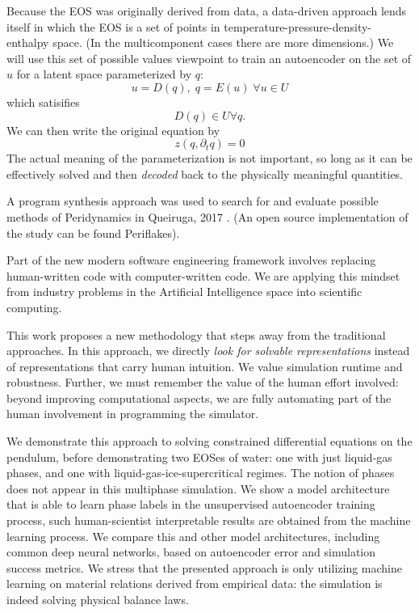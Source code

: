 \documentclass[]{article}
\begin{document}
Because the EOS was originally derived from data, a data-driven
approach lends itself in which the EOS is a set of points in
temperature-pressure-density-enthalpy space. (In the multicomponent
cases there are more dimensions.)
We will use this set of possible values viewpoint to train an
autoencoder on the set of $u$ for a latent space parameterized by $q$:
\begin{equation}
u = D(q), \; q=E(u) \;\forall u \in U
\end{equation}
which satisifies
\begin{equation}
  D(q)\in U \forall q.
\end{equation}
We can then write the original equation by
\begin{equation}
z(q,\partial_t q)=0
\end{equation}
The actual meaning of the parameterization is not important, so long as
it can be effectively solved and then \emph{decoded} back to the
physically meaningful quantities.

\cite{wu_physics-informed_2018}
\cite{xie_tempogan:_2018}

 A program synthesis approach was used to search for and evaluate possible methods of Peridynamics in Queiruga, 2017 \cite{queiruga2017numerical}. (An open source implementation of the study can be found Periflakes)\cite{queiruga2018periflakes}.

Part of the new modern software engineering framework involves replacing
human-written code with computer-written code. We are applying this
mindset from industry problems in the Artificial
Intelligence space into scientific computing.


This work proposes a new methodology that steps away from the
traditional approaches. 
In this approach, we directly \emph{look for solvable representations}
instead of representations that carry human intuition. We value
simulation runtime and robustness. Further, we must remember the value
of the human effort involved: beyond improving computational aspects,
we are fully automating part of the human involvement in programming
the simulator.




We demonstrate this approach to solving constrained differential
equations on the pendulum, before demonstrating two EOSes of water: one
with just liquid-gas phases, and one with liquid-gas-ice-supercritical
regimes. The notion of phases does not appear in this multiphase
simulation. We show a model architecture that is able to learn phase
labels in the unsupervised autoencoder training process, such
human-scientist interpretable results are obtained from the machine
learning process. We compare this and other model architectures,
including common deep neural networks, based on autoencoder error and
simulation success metrics. We stress that the presented approach is
only utilizing machine learning on material relations derived from
empirical data: the simulation is indeed solving physical balance laws.
\end{document}
